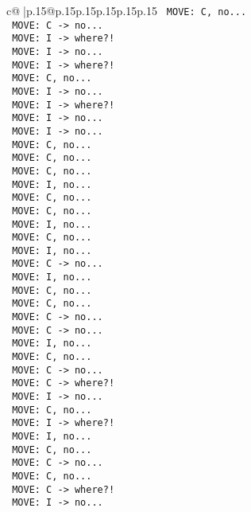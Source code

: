 \documentclass{article}
\begin{document}
{\begin{supertabular}{c@{$\;$}|p{.15\linewidth}@{}p{.15\linewidth}p{.15\linewidth}p{.15\linewidth}p{.15\linewidth}p{.15\linewidth}}
{{{\texttt{ MOVE: C, no...} \\
\texttt{ MOVE: C {-}> no...} \\
\texttt{ MOVE: I {-}> where?!} \\
\texttt{ MOVE: I {-}> no...} \\
\texttt{ MOVE: I {-}> where?!} \\
\texttt{ MOVE: C, no...} \\
\texttt{ MOVE: I {-}> no...} \\
\texttt{ MOVE: I {-}> where?!} \\
\texttt{ MOVE: I {-}> no...} \\
\texttt{ MOVE: I {-}> no...} \\
\texttt{ MOVE: C, no...} \\
\texttt{ MOVE: C, no...} \\
\texttt{ MOVE: C, no...} \\
\texttt{ MOVE: I, no...} \\
\texttt{ MOVE: C, no...} \\
\texttt{ MOVE: C, no...} \\
\texttt{ MOVE: I, no...} \\
\texttt{ MOVE: C, no...} \\
\texttt{ MOVE: I, no...} \\
\texttt{ MOVE: C {-}> no...} \\
\texttt{ MOVE: I, no...} \\
\texttt{ MOVE: C, no...} \\
\texttt{ MOVE: C, no...} \\
\texttt{ MOVE: C {-}> no...} \\
\texttt{ MOVE: C {-}> no...} \\
\texttt{ MOVE: I, no...} \\
\texttt{ MOVE: C, no...} \\
\texttt{ MOVE: C {-}> no...} \\
\texttt{ MOVE: C {-}> where?!} \\
\texttt{ MOVE: I {-}> no...} \\
\texttt{ MOVE: C, no...} \\
\texttt{ MOVE: I {-}> where?!} \\
\texttt{ MOVE: I, no...} \\
\texttt{ MOVE: C, no...} \\
\texttt{ MOVE: C {-}> no...} \\
\texttt{ MOVE: C, no...} \\
\texttt{ MOVE: C {-}> where?!} \\
\texttt{ MOVE: I {-}> no...} \\
}}}
\end{supertabular}}
\end{document}

